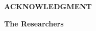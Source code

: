 \newpage
{}
{}

\begin{center}
	\textbf{ACKNOWLEDGMENT}
\end{center}

\begin{doublespace}

	\begin{flushright}
		\textbf{The Researchers}
	\end{flushright}
\end{doublespace}
